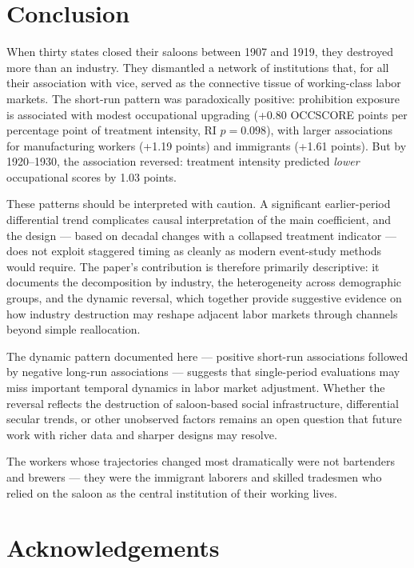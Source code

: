 \documentclass[12pt]{article}
\begin{document}
\section{Conclusion}
\label{sec:conclusion}

When thirty states closed their saloons between 1907 and 1919, they destroyed more than an industry. They dismantled a network of institutions that, for all their association with vice, served as the connective tissue of working-class labor markets. The short-run pattern was paradoxically positive: prohibition exposure is associated with modest occupational upgrading (+0.80 OCCSCORE points per percentage point of treatment intensity, RI $p = 0.098$), with larger associations for manufacturing workers (+1.19 points) and immigrants (+1.61 points). But by 1920--1930, the association reversed: treatment intensity predicted \emph{lower} occupational scores by 1.03 points.

These patterns should be interpreted with caution. A significant earlier-period differential trend complicates causal interpretation of the main coefficient, and the design --- based on decadal changes with a collapsed treatment indicator --- does not exploit staggered timing as cleanly as modern event-study methods would require. The paper's contribution is therefore primarily descriptive: it documents the decomposition by industry, the heterogeneity across demographic groups, and the dynamic reversal, which together provide suggestive evidence on how industry destruction may reshape adjacent labor markets through channels beyond simple reallocation.

The dynamic pattern documented here --- positive short-run associations followed by negative long-run associations --- suggests that single-period evaluations may miss important temporal dynamics in labor market adjustment. Whether the reversal reflects the destruction of saloon-based social infrastructure, differential secular trends, or other unobserved factors remains an open question that future work with richer data and sharper designs may resolve.

The workers whose trajectories changed most dramatically were not bartenders and brewers --- they were the immigrant laborers and skilled tradesmen who relied on the saloon as the central institution of their working lives.


\section*{Acknowledgements}
\end{document}

